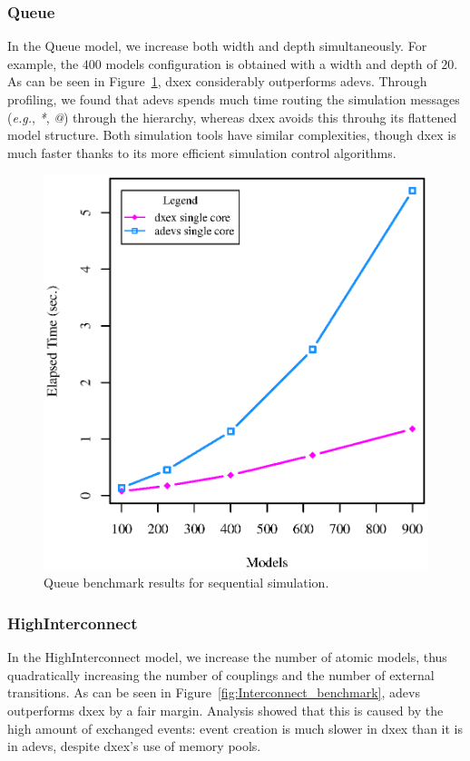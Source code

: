 \subsubsection{Queue}
In the Queue model, we increase both width and depth simultaneously.
For example, the $400$ models configuration is obtained with a width and depth of $20$.
As can be seen in Figure~\ref{fig:Queue_benchmark}, dxex considerably outperforms adevs.
Through profiling, we found that adevs spends much time routing the simulation messages (\textit{e.g.}, \textit{*}, \textit{@}) through the hierarchy, whereas dxex avoids this throuhg its flattened model structure.
Both simulation tools have similar complexities, though dxex is much faster thanks to its more efficient simulation control algorithms.

\begin{figure}
    \center
	\includegraphics[width=\plotfraction\columnwidth]{fig/queue_sequential.eps}
	\caption{Queue benchmark results for sequential simulation.}
	\label{fig:Queue_benchmark}
\end{figure}

\subsubsection{HighInterconnect}
In the HighInterconnect model, we increase the number of atomic models, thus quadratically increasing the number of couplings and the number of external transitions.
As can be seen in Figure~\ref{fig:Interconnect_benchmark}, adevs outperforms dxex by a fair margin.
Analysis showed that this is caused by the high amount of exchanged events: event creation is much slower in dxex than it is in adevs, despite dxex's use of memory pools.

